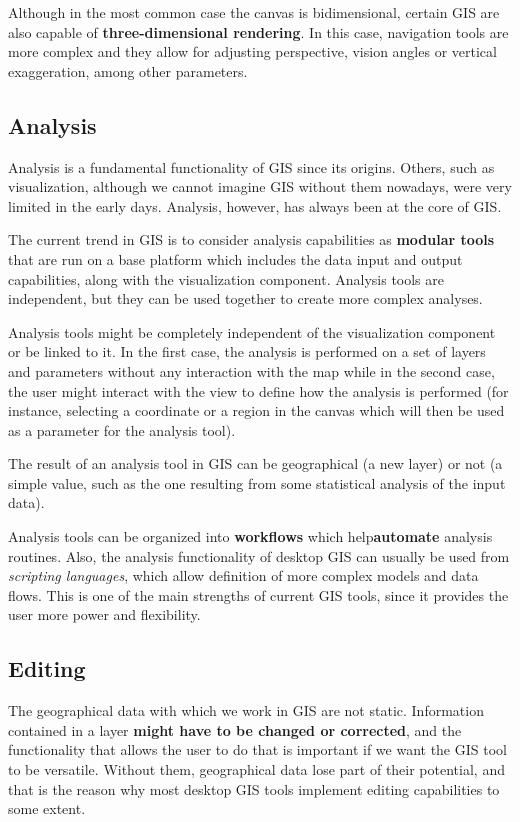 Although in the most common case the canvas is bidimensional, certain GIS are also capable of \textbf{three-dimensional rendering}. In this case, navigation tools are more complex and they allow for adjusting perspective, vision angles or vertical exaggeration, among other parameters.

\subsection{Analysis}

Analysis is a fundamental functionality of GIS since its origins. Others, such as visualization, although we cannot imagine GIS without them nowadays, were very limited in the early days. Analysis, however, has always been at the core of GIS.

The current trend in GIS is to consider analysis capabilities as \textbf{modular tools} that are run on a base platform which includes the data input and output capabilities, along with the visualization component. Analysis tools are independent, but they can be used together to create more complex analyses.

Analysis tools might be completely independent of the visualization component or be linked to it. In the first case, the analysis is performed on a set of layers and parameters without any interaction with the map while in the second case, the user might interact with the view to define how the analysis is performed (for instance, selecting a coordinate or a region in the canvas which will then be used as a parameter for the analysis tool).

The result of an analysis tool in GIS can be geographical (a new layer) or not (a simple value, such as the one resulting from some statistical analysis of the input data).

Analysis tools can be organized into \textbf{workflows} which help\textbf{automate} analysis routines. Also, the analysis functionality of desktop GIS can usually be used from \emph{scripting languages}, which allow definition of more complex models and data flows. This is one of the main strengths of current GIS tools, since it provides the user more power and flexibility.

\subsection{Editing}

The geographical data with which we work in GIS are not static. Information contained in a layer \textbf{might have to be changed or corrected}, and the functionality that allows the user to do that is important if we want the GIS tool to be versatile. Without them, geographical data lose part of their potential, and that is the reason why most desktop GIS tools implement editing capabilities to some extent.

